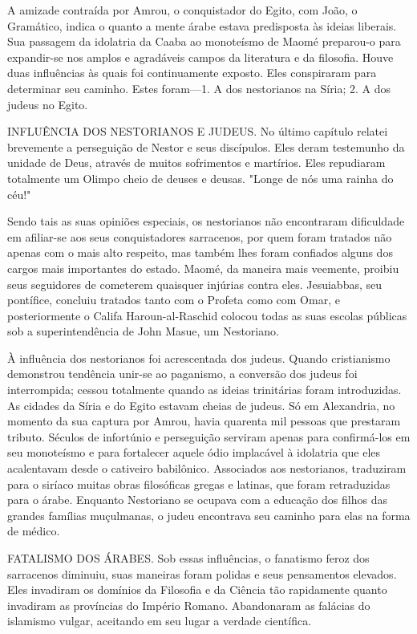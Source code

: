 \documentclass[11pt,a5paper,twoside,openany]{book}
\begin{document}
A amizade contraída por Amrou, o conquistador do Egito, com João, o Gramático, indica o quanto a mente árabe estava predisposta às ideias liberais. Sua passagem da idolatria da Caaba ao monoteísmo de Maomé preparou-o para expandir-se nos amplos e agradáveis ​​campos da literatura e da filosofia. Houve duas influências às quais foi continuamente exposto. Eles conspiraram para determinar seu caminho. Estes foram—1. A dos nestorianos na Síria; 2. A dos judeus no Egito.

INFLUÊNCIA DOS NESTORIANOS E JUDEUS. No último capítulo relatei brevemente a perseguição de Nestor e seus discípulos. Eles deram testemunho da unidade de Deus, através de muitos sofrimentos e martírios. Eles repudiaram totalmente um Olimpo cheio de deuses e deusas. "Longe de nós uma rainha do céu!"

Sendo tais as suas opiniões especiais, os nestorianos não encontraram dificuldade em afiliar-se aos seus conquistadores sarracenos, por quem foram tratados não apenas com o mais alto respeito, mas também lhes foram confiados alguns dos cargos mais importantes do estado. Maomé, da maneira mais veemente, proibiu seus seguidores de cometerem quaisquer injúrias contra eles. Jesuiabbas, seu pontífice, concluiu tratados tanto com o Profeta como com Omar, e posteriormente o Califa Haroun-al-Raschid colocou todas as suas escolas públicas sob a superintendência de John Masue, um Nestoriano.

À influência dos nestorianos foi acrescentada dos judeus. Quando cristianismo demonstrou tendência unir-se ao paganismo, a conversão dos judeus foi interrompida; cessou totalmente quando as ideias trinitárias foram introduzidas. As cidades da Síria e do Egito estavam cheias de judeus. Só em Alexandria, no momento da sua captura por Amrou, havia quarenta mil pessoas que prestaram tributo. Séculos de infortúnio e perseguição serviram apenas para confirmá-los em seu monoteísmo e para fortalecer aquele ódio implacável à idolatria que eles acalentavam desde o cativeiro babilônico. Associados aos nestorianos, traduziram para o siríaco muitas obras filosóficas gregas e latinas, que foram retraduzidas para o árabe. Enquanto Nestoriano se ocupava com a educação dos filhos das grandes famílias muçulmanas, o judeu encontrava seu caminho para elas na forma de médico.

FATALISMO DOS ÁRABES. Sob essas influências, o fanatismo feroz dos sarracenos diminuiu, suas maneiras foram polidas e seus pensamentos elevados. Eles invadiram os domínios da Filosofia e da Ciência tão rapidamente quanto invadiram as províncias do Império Romano. Abandonaram as falácias do islamismo vulgar, aceitando em seu lugar a verdade científica.
\end{document}
